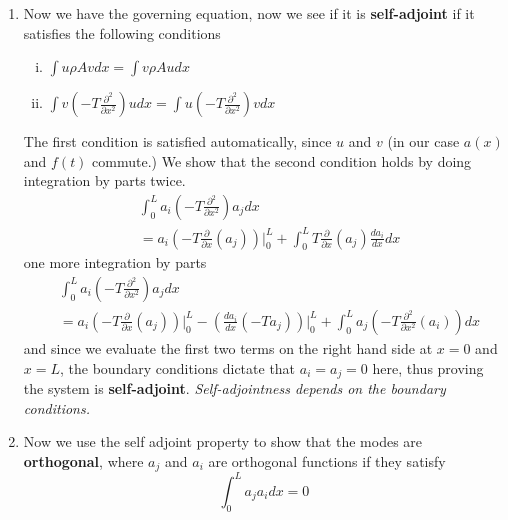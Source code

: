 \begin{enumerate}
\begin{enumerate}
  \end{enumerate}
  \item{Now we have the governing equation, now we see if it is \textbf{self-adjoint} if it satisfies the following conditions}
  \begin{enumerate}[(i)]
    \setlength{\itemsep}{0pt}
    \item{$\int u\rho Avdx=\int v\rho Audx$}
    \item{$\int v\left(-T\frac{\partial^{2}}{\partial{}x^{2}}\right)udx=\int u\left(-T\frac{\partial^{2}}{\partial{}x^{2}}\right)vdx$}
  \end{enumerate}
  The first condition is satisfied automatically, since $u$ and $v$ (in our case $a(x)$ and $f(t)$ commute.)
  We show that the second condition holds by doing integration by parts twice.
  \begin{equation*}
    \begin{split}
      &\int_{0}^{L}a_{i}\left(-T\frac{\partial^{2}}{\partial{}x^{2}}\right)a_{j}dx \\
      &= a_{i}\left(-T\frac{\partial}{\partial{}x}(a_{j})\right)\biggr|_{0}^{L}+\int_{0}^{L}T\frac{\partial}{\partial{}x}(a_{j})\frac{da_{i}}{dx}dx
    \end{split}
  \end{equation*}
  one more integration by parts
  \begin{equation*}
    \begin{split}
      &\int_{0}^{L}a_{i}\left(-T\frac{\partial^{2}}{\partial{}x^{2}}\right)a_{j}dx \\
      &=a_{i}\left(-T\frac{\partial}{\partial{}x}(a_{j})\right)\biggr|_{0}^{L}-\left(\frac{da_{i}}{dx}(-Ta_{j})\right)\biggr|_{0}^{L}+\int_{0}^{L}a_{j}\left(-T\frac{\partial^{2}}{\partial{}x^{2}}(a_{i})\right)dx
      \end{split}
  \end{equation*}
  and since we evaluate the first two terms on the right hand side at $x=0$ and $x=L$, the boundary conditions dictate that $a_{i}=a_{j}=0$ here, thus proving the system is \textbf{self-adjoint}.
  \textit{Self-adjointness depends on the boundary conditions.}
  \item{Now we use the self adjoint property to show that the modes are \textbf{orthogonal}, where $a_{j}$ and $a_{i}$ are orthogonal functions if they satisfy}
  \begin{equation*}
    \int_{0}^{L}a_{j}a_{i}dx=0
  \end{equation*}
\end{enumerate}
